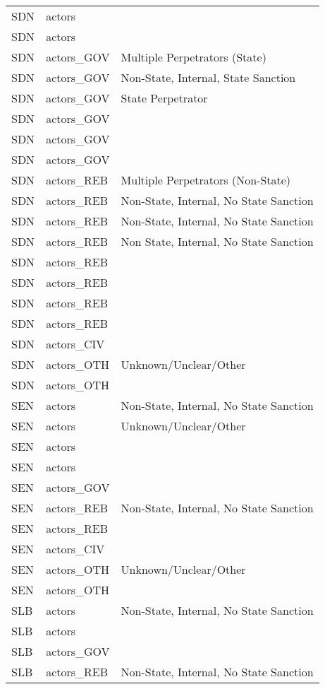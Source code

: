 \begin{table}[ht]
\begin{tabular}{lll}
  SDN & actors &  \\ 
  SDN & actors &  \\ 
  SDN & actors\_GOV & Multiple Perpetrators (State) \\ 
  SDN & actors\_GOV & Non-State, Internal, State Sanction \\ 
  SDN & actors\_GOV & State Perpetrator \\ 
  SDN & actors\_GOV &  \\ 
  SDN & actors\_GOV &  \\ 
  SDN & actors\_GOV &  \\ 
  SDN & actors\_REB & Multiple Perpetrators (Non-State) \\ 
  SDN & actors\_REB & Non-State, Internal, No State Sanction \\ 
  SDN & actors\_REB & Non-State, Internal, No State Sanction \\ 
  SDN & actors\_REB & Non State, Internal, No State Sanction \\ 
  SDN & actors\_REB &  \\ 
  SDN & actors\_REB &  \\ 
  SDN & actors\_REB &  \\ 
  SDN & actors\_REB &  \\ 
  SDN & actors\_CIV &  \\ 
  SDN & actors\_OTH & Unknown/Unclear/Other \\ 
  SDN & actors\_OTH &  \\ 
  SEN & actors & Non-State, Internal, No State Sanction \\ 
  SEN & actors & Unknown/Unclear/Other \\ 
  SEN & actors &  \\ 
  SEN & actors &  \\ 
  SEN & actors\_GOV &  \\ 
  SEN & actors\_REB & Non-State, Internal, No State Sanction \\ 
  SEN & actors\_REB &  \\ 
  SEN & actors\_CIV &  \\ 
  SEN & actors\_OTH & Unknown/Unclear/Other \\ 
  SEN & actors\_OTH &  \\ 
  SLB & actors & Non-State, Internal, No State Sanction \\ 
  SLB & actors &  \\ 
  SLB & actors\_GOV &  \\ 
  SLB & actors\_REB & Non-State, Internal, No State Sanction \\ 

\end{tabular}
\end{table}
